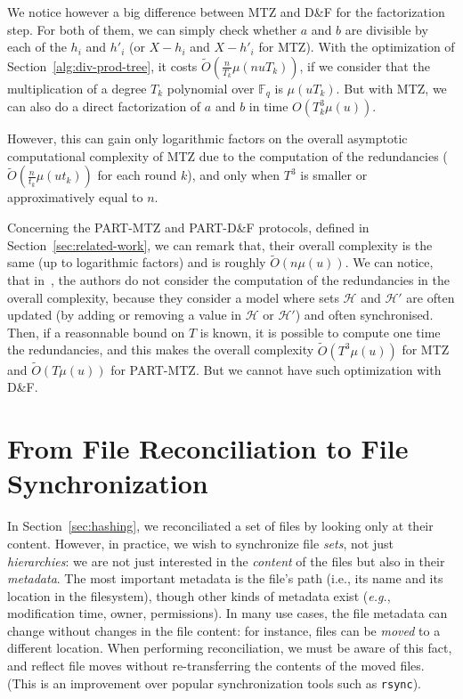 \documentclass[twoside,envcountsame,runningheads]{llncs}
\newcommand{\Oapp}{\ensuremath{\tilde{O}}}
\newcommand{\Set}{\mathcal{H}}
\newcommand{\df}{D\&F\xspace}
\newcommand{\rsync}{\texttt{rsync}\xspace}
\newcommand{\eg}{\textit{e.g.}\xspace}
\newcommand{\comm}[1]{\todo{#1}}
\begin{document}
We notice however a big difference between MTZ and \df for the factorization step.
For both of them, we can simply check whether $a$ and $b$ are divisible by each of the $h_i$ and $h'_i$ (or $X-h_i$ and $X - h'_i$ for MTZ).
With the optimization of Section~\ref{alg:div-prod-tree}, it costs $\Oapp(\frac{n}{T_k} \mu(nuT_k))$, if we consider that the multiplication of a degree $T_k$ polynomial over $\mathbb{F}_q$ is $\mu(uT_k)$.
But with MTZ, we can also do a direct factorization of $a$ and $b$ in time $O(T_k^3 \mu(u))$.

However, this can gain only logarithmic factors on the overall asymptotic computational complexity of MTZ due to the computation of the redundancies ($\Oapp(\frac{n}{t_k} \mu(ut_k))$ for each round $k$), and only when $T^3$ is smaller or approximatively equal to $n$.

Concerning the PART-MTZ and PART-\df protocols, defined in Section~\ref{sec:related-work}, we can remark that, their overall complexity is the same (up to logarithmic factors) and is roughly $\Oapp(n \mu(u))$.
We can notice, that in~\cite{Mins1,PSRec}, the authors do not consider the computation of the redundancies in the overall complexity, because they consider a model where sets $\Set$ and $\Set'$ are often updated (by adding or removing a value in $\Set$ or $\Set'$) and often synchronised.
Then, if a reasonnable bound on $T$ is known, it is possible to compute one time the redundancies, and this makes the overall complexity $\Oapp(T^3 \mu(u))$ for MTZ and $\Oapp(T \mu(u))$ for PART-MTZ.
But we cannot have such optimization with \df.
\comm{TODO: maybe find something more positive ???}



\section{From File Reconciliation to File Synchronization}
\label{sec:files}

In Section~\ref{sec:hashing}, we reconciliated a set of files by looking only at their content.
However, in practice, we wish to synchronize file \emph{sets}, not just
\emph{hierarchies}: we are not just interested in the \emph{content} of the
files but also in their \emph{metadata}. The most important metadata is the file's
path (i.e., its name and its location in the filesystem), though other kinds of
metadata exist (\eg, modification time, owner, permissions). In many use
cases, the file metadata can change without changes in the file content: for
instance, files can be \emph{moved} to a different location. When performing
reconciliation, we must be aware of this fact, and reflect file moves without
re-transferring the contents of the moved files. (This is an improvement over
popular synchronization tools such as \rsync).
\end{document}
